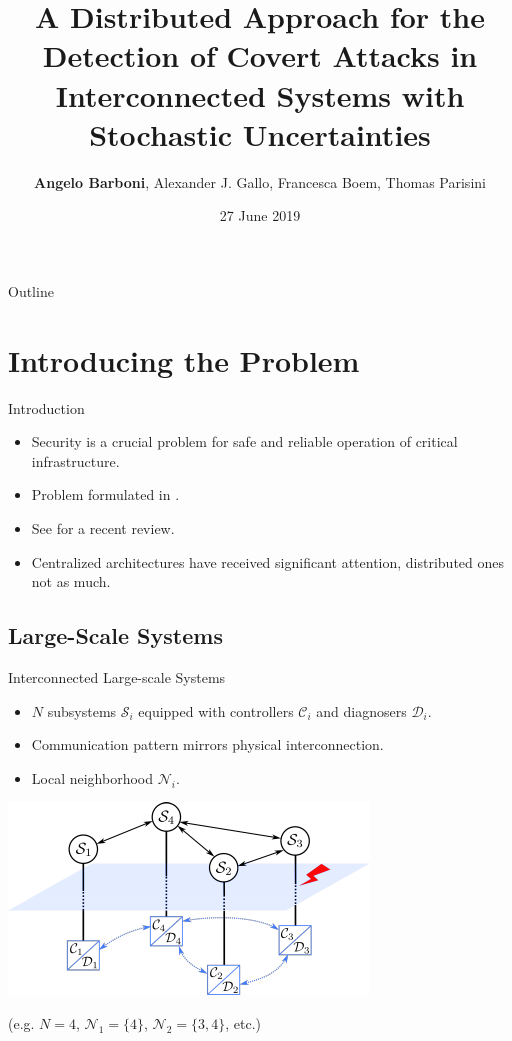 \documentclass[presentation]{beamer}
\title{A Distributed Approach for the Detection of Covert Attacks in Interconnected Systems with Stochastic Uncertainties}
\author{\textbf{Angelo Barboni}, Alexander J. Gallo, Francesca Boem, Thomas Parisini}
\date{27 June 2019}
\begin{document}
 
\begin{frame}
\titlepage
\end{frame}

\begin{frame}{Outline}
    \tableofcontents
\end{frame}

\section{Introducing the Problem}

\begin{frame}{Introduction}
\begin{itemize}
    \item<1-> Security is a crucial problem for safe and reliable operation of critical infrastructure.
    \item<2-> Problem formulated in \parencite{mo2010false,teixeira2015secure,Pasqualetti2015}.
    \item<3-> See \parencite{dibaji2019systems} for a recent review.
    \item<4> Centralized architectures have received significant attention, distributed ones not as much. 
\end{itemize}
\end{frame}

\subsection{Large-Scale Systems}

\begin{frame}{Interconnected Large-scale Systems}
\begin{itemize}
    \item $N$ subsystems $\mathcal S_i$ equipped with controllers $\mathcal C_i$ and diagnosers $\mathcal D_i$.
    \item Communication pattern mirrors physical interconnection.
    \item Local neighborhood $\mathcal N_i$.
\end{itemize}
\begin{center}
    \includegraphics[scale=1]{fig/cdc19arch.pdf}
\end{center}
(e.g. $N=4$, $\mathcal N_1 = \{4\}$, $\mathcal N_2 = \{3,4\}$, etc.)
\end{frame}
\end{document}
